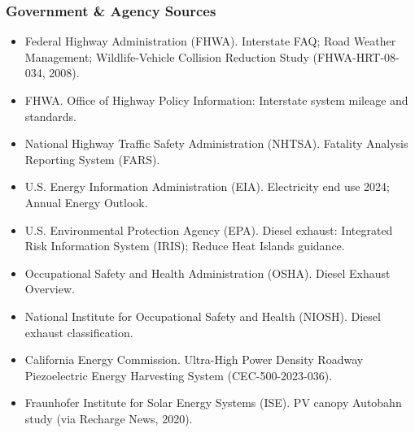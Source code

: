\documentclass[11pt,letterpaper]{article}
\begin{document}
\subsubsection{Government \& Agency Sources}
\begin{itemize}
  \item Federal Highway Administration (FHWA). Interstate FAQ; Road Weather Management; Wildlife-Vehicle Collision Reduction Study (FHWA-HRT-08-034, 2008).
  \item FHWA. Office of Highway Policy Information: Interstate system mileage and standards.
  \item National Highway Traffic Safety Administration (NHTSA). Fatality Analysis Reporting System (FARS).
  \item U.S. Energy Information Administration (EIA). Electricity end use 2024; Annual Energy Outlook.
  \item U.S. Environmental Protection Agency (EPA). Diesel exhaust: Integrated Risk Information System (IRIS); Reduce Heat Islands guidance.
  \item Occupational Safety and Health Administration (OSHA). Diesel Exhaust Overview.
  \item National Institute for Occupational Safety and Health (NIOSH). Diesel exhaust classification.
  \item California Energy Commission. Ultra-High Power Density Roadway Piezoelectric Energy Harvesting System (CEC-500-2023-036).
  \item Fraunhofer Institute for Solar Energy Systems (ISE). PV canopy Autobahn study (via Recharge News, 2020).
\end{itemize}
\end{document}
